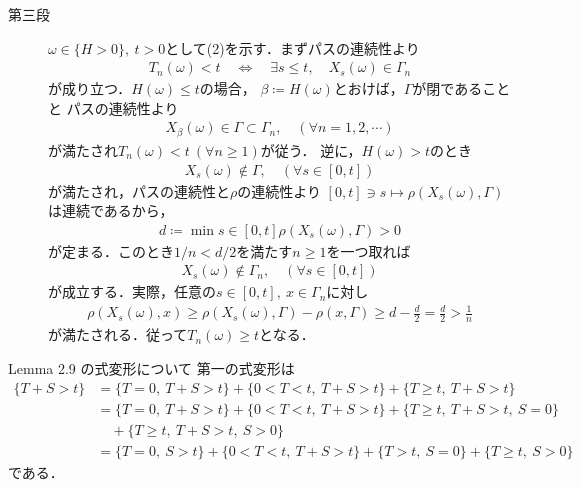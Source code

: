 \begin{prf}
\begin{description}
			\item[第三段]
				$\omega \in \{H>0\},\ t > 0$として(2)を示す．まずパスの連続性より
				\begin{align}
					T_n(\omega) < t \quad \Leftrightarrow \quad
					\exists s \leq t, \quad X_s(\omega) \in \Gamma_n
				\end{align}
				が成り立つ．$H(\omega) \leq t$の場合，
				$\beta \coloneqq H(\omega)$とおけば，$\Gamma$が閉であることと
				パスの連続性より
				\begin{align}
					X_\beta(\omega) \in \Gamma \subset \Gamma_n,
					\quad (\forall n=1,2,\cdots)
				\end{align}
				が満たされ$T_n(\omega) < t\ (\forall n \geq 1)$が従う．
				逆に，$H(\omega) > t$のとき
				\begin{align}
					X_s(\omega) \notin \Gamma,
					\quad (\forall s \in [0,t])
				\end{align}
				が満たされ，パスの連続性と$\rho$の連続性より
				$[0,t] \ni s \longmapsto \rho(X_s(\omega),\Gamma)$
				は連続であるから，
				\begin{align}
					d \coloneqq \min{s \in [0,t]}{\rho(X_s(\omega),\Gamma)} > 0
				\end{align}
				が定まる．このとき$1/n < d/2$を満たす$n \geq 1$を一つ取れば
				\begin{align}
					X_s(\omega) \notin \Gamma_n,
					\quad (\forall s \in [0,t])
				\end{align}
				が成立する．実際，任意の$s \in [0,t],\ x \in \Gamma_n$に対し
				\begin{align}
					\rho(X_s(\omega),x)
					\geq \rho(X_s(\omega),\Gamma) - \rho(x,\Gamma)
					\geq d - \frac{d}{2}
					= \frac{d}{2}
					> \frac{1}{n}
				\end{align}
				が満たされる．従って$T_n(\omega) \geq t$となる．
				\QED
		\end{description}
	\end{prf}
	
	\begin{itembox}[l]{Lemma 2.9 の式変形について}
		第一の式変形は
		\begin{align}
			\{T + S > t\}
			&= \{T = 0,\ T+S > t\} + \{0 < T < t,\ T+S > t\} + \{T \geq t,\ T+S > t\} \\
			&= \{T = 0,\ T+S > t\} + \{0 < T < t,\ T+S > t\} + \{T \geq t,\ T+S > t,\ S = 0\} \\
				&\quad+ \{T \geq t,\ T+S > t,\ S > 0\} \\
			&= \{T = 0,\ S > t\} + \{0 < T < t,\ T+S > t\} + \{T > t,\ S = 0\}
				+ \{T \geq t,\ S > 0\}
		\end{align}
		である．
	\end{itembox}
	
